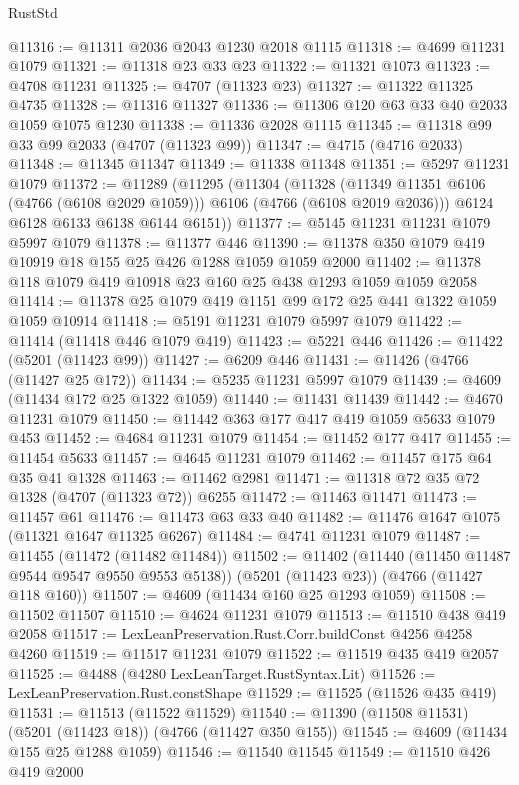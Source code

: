 \begin{lexlean}{RustStd}
\begin{coremodule}
{\begin{coremodule}
{{{{{{{{{{{{{{{{{{{{{{{{{{{{{{{{{{{@11316 := @11311 @2036 @2043 @1230 @2018 @1115
@11318 := @4699 @11231 @1079
@11321 := @11318 @23 @33 @23
@11322 := @11321 @1073
@11323 := @4708 @11231
@11325 := @4707 (@11323 @23)
@11327 := @11322 @11325 @4735
@11328 := @11316 @11327
@11336 := @11306 @120 @63 @33 @40 @2033 @1059 @1075 @1230
@11338 := @11336 @2028 @1115
@11345 := @11318 @99 @33 @99 @2033 (@4707 (@11323 @99))
@11347 := @4715 (@4716 @2033)
@11348 := @11345 @11347
@11349 := @11338 @11348
@11351 := @5297 @11231 @1079
@11372 := @11289
    (@11295
      (@11304
        (@11328 (@11349 @11351 @6106 (@4766 (@6108 @2029 @1059))) @6106 (@4766 (@6108 @2019 @2036)))
        @6124
        @6128
        @6133
        @6138
        @6144
        @6151))
@11377 := @5145 @11231 @11231 @1079 @5997 @1079
@11378 := @11377 @446
@11390 := @11378 @350 @1079 @419 @10919 @18 @155 @25 @426 @1288 @1059 @1059 @2000
@11402 := @11378 @118 @1079 @419 @10918 @23 @160 @25 @438 @1293 @1059 @1059 @2058
@11414 := @11378 @25 @1079 @419 @1151 @99 @172 @25 @441 @1322 @1059 @1059 @10914
@11418 := @5191 @11231 @1079 @5997 @1079
@11422 := @11414 (@11418 @446 @1079 @419)
@11423 := @5221 @446
@11426 := @11422 (@5201 (@11423 @99))
@11427 := @6209 @446
@11431 := @11426 (@4766 (@11427 @25 @172))
@11434 := @5235 @11231 @5997 @1079
@11439 := @4609 (@11434 @172 @25 @1322 @1059)
@11440 := @11431 @11439
@11442 := @4670 @11231 @1079
@11450 := @11442 @363 @177 @417 @419 @1059 @5633 @1079 @453
@11452 := @4684 @11231 @1079
@11454 := @11452 @177 @417
@11455 := @11454 @5633
@11457 := @4645 @11231 @1079
@11462 := @11457 @175 @64 @35 @41 @1328
@11463 := @11462 @2981
@11471 := @11318 @72 @35 @72 @1328 (@4707 (@11323 @72)) @6255
@11472 := @11463 @11471
@11473 := @11457 @61
@11476 := @11473 @63 @33 @40
@11482 := @11476 @1647 @1075 (@11321 @1647 @11325 @6267)
@11484 := @4741 @11231 @1079
@11487 := @11455 (@11472 (@11482 @11484))
@11502 := @11402
    (@11440 (@11450 @11487 @9544 @9547 @9550 @9553 @5138))
    (@5201 (@11423 @23))
    (@4766 (@11427 @118 @160))
@11507 := @4609 (@11434 @160 @25 @1293 @1059)
@11508 := @11502 @11507
@11510 := @4624 @11231 @1079
@11513 := @11510 @438 @419 @2058
@11517 := LexLeanPreservation.Rust.Corr.buildConst @4256 @4258 @4260
@11519 := @11517 @11231 @1079
@11522 := @11519 @435 @419 @2057
@11525 := @4488 (@4280 LexLeanTarget.RustSyntax.Lit)
@11526 := LexLeanPreservation.Rust.constShape
@11529 := @11525 (@11526 @435 @419)
@11531 := @11513 (@11522 @11529)
@11540 := @11390 (@11508 @11531) (@5201 (@11423 @18)) (@4766 (@11427 @350 @155))
@11545 := @4609 (@11434 @155 @25 @1288 @1059)
@11546 := @11540 @11545
@11549 := @11510 @426 @419 @2000
}}}}}}}}}}}}}}}}}}}}}}}}}}}}}}}}}}}
\end{coremodule}}
\end{coremodule}
\end{lexlean}
